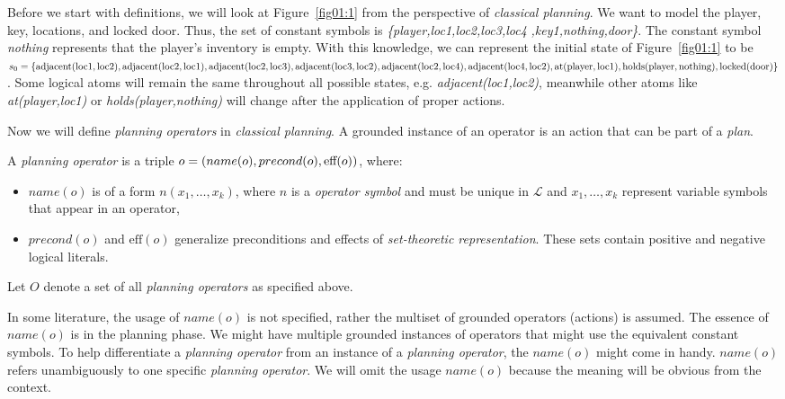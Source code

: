 \begin{example}\label{ex01:3}
    Before we start with definitions, we will look at Figure~\ref{fig01:1} from the perspective of \emph{classical planning}. We want to model the player, key, locations, and locked door. Thus, the set of constant symbols is \emph{\{player,loc1,loc2,loc3,loc4} \emph{,key1,nothing,door\}}. The constant symbol \emph{nothing} represents that the player's inventory is empty. With this knowledge, we can represent the initial state of Figure~\ref{fig01:1} to be $s_0=\{\mathrm{adjacent(loc1,loc2)},\mathrm{adjacent(loc2,loc1)},\mathrm{adjacent(loc2,loc3)}, \\ \mathrm{adjacent(loc3,loc2)}, \mathrm{adjacent(loc2,loc4)},\mathrm{adjacent(loc4,loc2)}, \mathrm{at(player,loc1)}, \\ \mathrm{holds(player,nothing)}, \mathrm{locked(door)}\}$. Some logical atoms will remain the same throughout all possible states, e.g. \emph{adjacent(loc1,loc2)}, meanwhile other atoms like \emph{at(player,loc1)} or \emph{holds(player,nothing)} will change after the application of proper actions.
\end{example}

\medskip\noindent
Now we will define \emph{planning operators} in \emph{classical planning}. A grounded instance of an operator is an action that can be part of a \emph{plan}.

\pagebreak

\begin{defn}\label{def01:5}
    A \emph{planning operator} is a triple $o = (name(o),precond(o), \\ \text{eff}(o))$, where:

        \begin{itemize}
            \item $name(o)$ is of a form $n(x_1,\dots,x_k)$, where $n$ is a \emph{operator symbol} and must be unique in $\mathcal{L}$ and $x_1,\dots,x_k$ represent variable symbols that appear in an operator,

            \item $precond(o)$ and $\text{eff}(o)$ generalize preconditions and effects of \emph{set-theoretic representation}. These sets contain positive and negative logical literals.
        \end{itemize}

    Let $O$ denote a set of all \emph{planning operators} as specified above.
\end{defn}

\medskip\noindent
In some literature, the usage of $name(o)$ is not specified, rather the multiset of grounded operators (actions) is assumed. The essence of $name(o)$ is in the planning phase. We might have multiple grounded instances of operators that might use the equivalent constant symbols. To help differentiate a \emph{planning operator} from an instance of a \emph{planning operator}, the $name(o)$ might come in handy. $name(o)$ refers unambiguously to one specific \emph{planning operator}. We will omit the usage $name(o)$ because the meaning will be obvious from the context.


